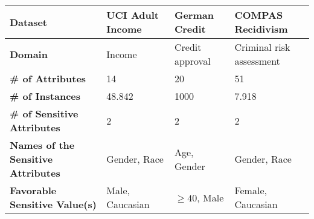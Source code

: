
\begin{table*}[ht!]
\begin{tabular}{|l|l|l|l|}
\hline
\textbf{Dataset}                                                                        & \textbf{UCI Adult Income}                                                                             & \textbf{German Credit}                                            & \textbf{COMPAS Recidivism}                                                   \\ \hline
\textbf{Domain}                                                                         & Income                                                                                                & Credit approval                                                   & Criminal risk assessment                                                     \\ \hline
\textbf{\# of Attributes}                                                               & 14                                                                                                    & 20                                                                & 51                                                                           \\ \hline
\textbf{\# of Instances}                                                                & 48.842                                                                                                & 1000                                                              & 7.918                                                                        \\ \hline
\textbf{\# of Sensitive Attributes}                                                     & 2                                                                                                     & 2                                                                 & 2                                                                            \\ \hline
\textbf{Names of the Sensitive Attributes}                                              & Gender, Race                                                                                          & Age, Gender                                                       & Gender, Race                                                                 \\ \hline
\textbf{Favorable Sensitive Value(s)}                                                   & Male, Caucasian                                                                                       & $\ge 40$, Male                                           & Female, Caucasian                                                            \\ \hline

\end{tabular}
\end{table*}
